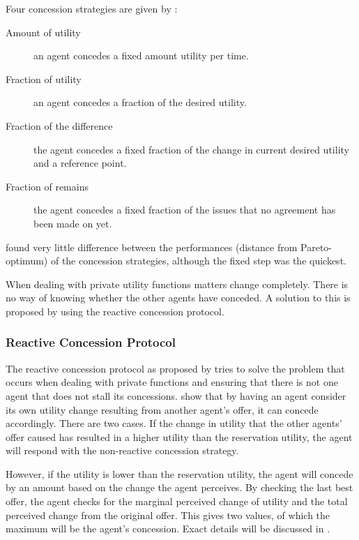 Four concession strategies are given by \citet{wu2009efficient}: 
\begin{description}
	\item[Amount of utility] an agent concedes a fixed amount utility per time. 
	\item[Fraction of utility] an agent concedes a fraction of the desired utility. 
	\item[Fraction of the difference] the agent concedes a fixed fraction of the change in current desired utility and a reference point. 
	\item[Fraction of remains] the agent concedes a fixed fraction of the issues that no agreement has been made on yet. \end{description} 
\citet{wu2009efficient} found very little difference between the performances (distance from Pareto-optimum) of the concession strategies, although the fixed step was the quickest. 

\begin{definition*}
	
\end{definition*}
When dealing with private utility functions matters change completely. There is no way of knowing whether the other agents have conceded. A solution to this is proposed by \citet{zheng2015automated} using the reactive concession protocol.

\subsubsection{Reactive Concession Protocol}
The reactive concession protocol as proposed by \citet{zheng2015automated} tries to solve the problem that occurs when dealing with private functions and ensuring that there is not one agent that does not stall its concessions. \citet{zheng2015automated} show that by having an agent consider its own utility change resulting from another agent's offer, it can concede accordingly. There are two cases. If the change in utility that the other agents' offer caused has resulted in a higher utility than the reservation utility, the agent will respond with the non-reactive concession strategy. 

However, if the utility is lower than the reservation utility, the agent will concede by an amount based on the change the agent perceives. By checking the last best offer, the agent checks for the marginal perceived change of utility and the total perceived change from the original offer. This gives two values, of which the maximum will be the agent's concession. Exact details will be discussed in .


